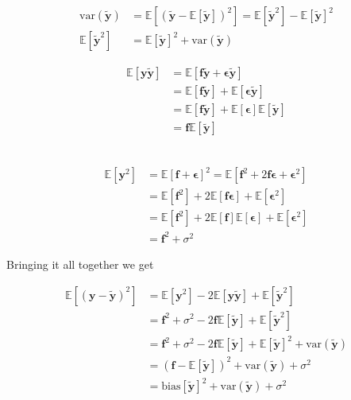 \documentclass[twoside,11pt]{report}
\begin{document}
\begin{minipage}[t]{.48\linewidth}
\begin{align*}
    \text{var}(\mathbf{\tilde{y}}) &= \mathbb{E}\left[\left(\tilde{\mathbf{y}}-\mathbb{E}\left[\mathbf{\tilde{y}}\right]\right)^2\right] 
         = \mathbb{E}[\mathbf{\tilde{y}}^2] - \mathbb{E}[\mathbf{\tilde{y}}]^2\\
    \mathbb{E}[\mathbf{\tilde{y}}^2] &= \mathbb{E}[\mathbf{\tilde{y}}]^2 + \text{var}(\mathbf{\tilde{y}})
\end{align*}
\end{minipage}
\hspace{2mm}
\begin{minipage}[t]{.45\linewidth}
\begin{align*}
    \mathbb{E}[\mathbf{y\tilde{y}}] & = \mathbb{E}[\mathbf{f\tilde{y}} + \mathbf{\epsilon\tilde{y}}]\\
& = \mathbb{E}[\mathbf{f\tilde{y}}] + \mathbb{E}[\mathbf{\epsilon\tilde{y}}]\\
& = \mathbb{E}[\mathbf{f\tilde{y}}] + \mathbb{E}[\mathbf{\epsilon}]\mathbb{E}[\mathbf{\tilde{y}}]\\
& = \mathbf{f}\mathbb{E}[\mathbf{\tilde{y}}]
\end{align*}
\end{minipage}\\
\begin{align*}
\mathbb{E}[\mathbf{y}^2] & = \mathbb{E}[\mathbf{f} + \mathbf{\epsilon}]^2 = \mathbb{E}[\mathbf{f}^2 + 2\mathbf{f}\mathbf{\epsilon} + \mathbf{\epsilon}^2]\\
& = \mathbb{E}[\mathbf{f}^2] + 2\mathbb{E}[\mathbf{f}\mathbf{\epsilon}] + \mathbb{E}[\mathbf{\epsilon}^2]\\
& = \mathbb{E}[\mathbf{f}^2] + 2\mathbb{E}[\mathbf{f}]\mathbb{E}[\mathbf{\epsilon}] + \mathbb{E}[\mathbf{\epsilon}^2]\\
& = \mathbf{f}^2 + \sigma^2
\end{align*}
\begin{center}
 Bringing it all together we get 
\end{center}
\begin{align*}
\mathbb{E}\left[(\mathbf{y}-\mathbf{\tilde{y}})^2\right] & = \mathbb{E}[\mathbf{y}^2] - 2\mathbb{E}[\mathbf{y\tilde{y}}] + \mathbb{E}[\mathbf{\tilde{y}}^2]\\
& = \mathbf{f}^2 + \sigma^2 - 2\mathbf{f}\mathbb{E}[\mathbf{\tilde{y}}] + \mathbb{E}[\mathbf{\tilde{y}}^2]\\
& = \mathbf{f}^2 + \sigma^2 - 2\mathbf{f}\mathbb{E}[\mathbf{\tilde{y}}] + \mathbb{E}[\mathbf{\tilde{y}}]^2 + \text{var}(\mathbf{\tilde{y}})\\
& = (\mathbf{f} - \mathbb{E}[\mathbf{\tilde{y}}])^2 + \text{var}(\mathbf{\tilde{y}}) + \sigma^2\\
& = \text{bias}[\mathbf{\tilde{y}}]^2 + \text{var}(\mathbf{\tilde{y}}) + \sigma^2
\end{align*}
\end{document}
